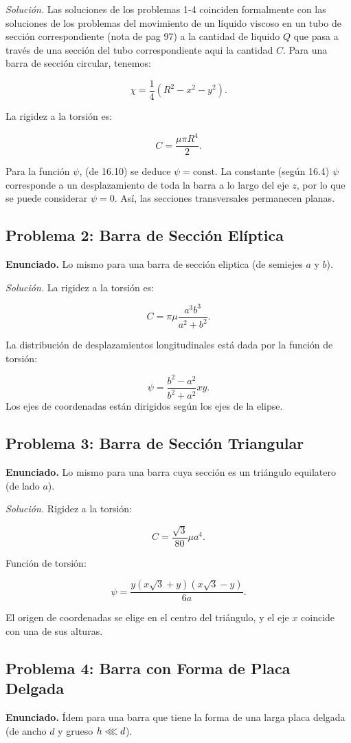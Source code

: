 \documentclass{article}
\begin{document}
\textit{Solución.} Las soluciones de los problemas 1-4 coinciden formalmente con las soluciones de los problemas del movimiento de un líquido viscoso en un tubo de sección correspondiente (nota de pag 97) a la cantidad de liquido $Q$ que pasa a través de una sección del tubo correspondiente aqui la cantidad $C$. Para una barra de sección circular, tenemos:

$$
\chi = \frac{1}{4} (R^2 - x^2 - y^2).
$$

La rigidez a la torsión es:

$$
C = \frac{\mu \pi R^4}{2}.
$$

Para la función $\psi$, (de 16.10) se deduce $\psi = \text{const}$. La constante (según 16.4) $\psi$ corresponde a un desplazamiento de toda la barra a lo largo del eje $z$, por lo que se puede considerar $\psi = 0$. Así, las secciones transversales permanecen planas.

\subsection*{Problema 2: Barra de Sección Elíptica}
\textbf{Enunciado.} Lo mismo para una barra de sección eliptica (de semiejes $a$ y $b$).

\textit{Solución.} La rigidez a la torsión es:

$$
C = \pi \mu \frac{a^3 b^3}{a^2 + b^2}.
$$

La distribución de desplazamientos longitudinales está dada por la función de torsión:

$$
\psi = \frac{b^2 - a^2}{b^2 + a^2} xy.
$$
Los ejes de coordenadas están dirigidos según los ejes de la elipse.

\subsection*{Problema 3: Barra de Sección Triangular}
\textbf{Enunciado.} Lo mismo para una barra cuya sección es un triángulo equilatero (de lado $a$).

\textit{Solución.} Rigidez a la torsión:

$$
C = \frac{\sqrt{3}}{80} \mu a^4.
$$

Función de torsión:

$$
\psi = \frac{y(x\sqrt{3} + y)(x\sqrt{3} - y)}{6a}.
$$

El origen de coordenadas se elige en el centro del triángulo, y el eje $x$ coincide con una de sus alturas.

\subsection*{Problema 4: Barra con Forma de Placa Delgada}
\textbf{Enunciado.} Ídem para una barra que tiene la forma de una larga placa delgada (de ancho $d$ y grueso $h\llless d$).
\end{document}
